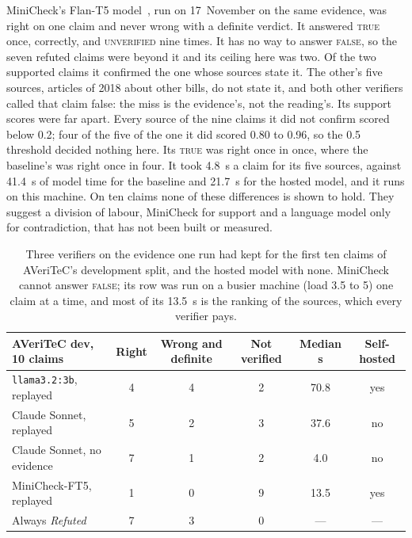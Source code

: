 MiniCheck's Flan-T5 model~\cite{tang2024minicheck}, run on 17~November
on the same evidence, was right on one claim and never wrong with a
definite verdict. It answered \textsc{true} once, correctly, and
\textsc{unverified} nine times. It has no way to answer \textsc{false},
so the seven refuted claims were beyond it and its ceiling here was two.
Of the two supported claims it confirmed the one whose sources state it.
The other's five sources, articles of 2018 about other bills, do not
state it, and both other verifiers called that claim false: the miss is
the evidence's, not the reading's. Its support scores were far apart.
Every source of the nine claims it did not confirm scored below 0.2;
four of the five of the one it did scored 0.80 to 0.96, so the 0.5
threshold decided nothing here. Its \textsc{true} was right once in
once, where the baseline's was right once in four. It took 4.8~s a claim
for its five sources, against 41.4~s of model time for the baseline and
21.7~s for the hosted model, and it runs on this machine. On ten claims
none of these differences is shown to hold. They suggest a division of
labour, MiniCheck for support and a language model only for
contradiction, that has not been built or measured.

\begin{table}[ht]
\centering
\small
\begin{tabular}{@{}lccccc@{}}
\toprule
AVeriTeC dev, 10 claims & Right & Wrong and definite & Not verified & Median s & Self-hosted \\
\midrule
\texttt{llama3.2:3b}, replayed & 4 & 4 & 2 & 70.8 & yes \\
Claude Sonnet, replayed & 5 & 2 & 3 & 37.6 & no \\
Claude Sonnet, no evidence & 7 & 1 & 2 & 4.0 & no \\
MiniCheck-FT5, replayed & 1 & 0 & 9 & 13.5 & yes \\
Always \emph{Refuted} & 7 & 3 & 0 & --- & --- \\
\bottomrule
\end{tabular}
\caption[The verifier on the same evidence]{Three verifiers on the
evidence one run had kept for the first ten claims of AVeriTeC's
development split, and the hosted model with none. MiniCheck cannot
answer \textsc{false}; its row was run on a busier machine (load 3.5 to
5) one claim at a time, and most of its 13.5~s is the ranking of the
sources, which every verifier pays.}
\label{tab:frameworks-verifier}
\end{table}

